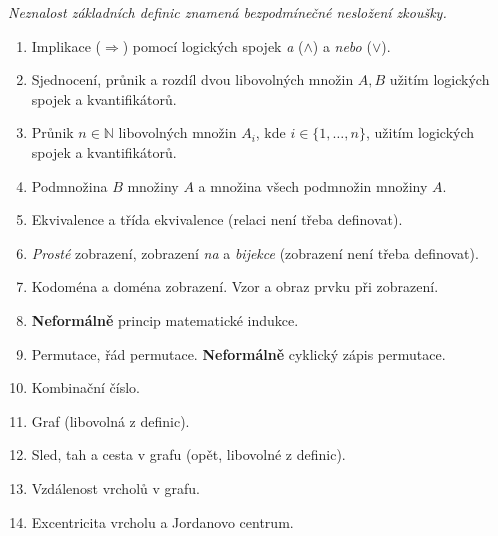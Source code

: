 \documentclass[a4paper,11pt]{article}
\newcommand{\N}{\mathbb{N}}
\begin{document}
 \begin{tcolorbox}[title=\textsf{Základní
   definice (0 bodů)},arc=0mm,boxsep=3mm,bottomrule=1pt,toprule=1pt,leftrule=-0.1mm,
   rightrule=-0.1mm,colframe=CornflowerBlue!80!white,
   colback=CornflowerBlue!5!white]
  \emph{Neznalost základních definic znamená bezpodmínečné nesložení
  zkoušky.}
  \begin{enumerate}
   \item Implikace ($ \Rightarrow $) pomocí logických spojek \emph{a} ($ \wedge
    $) a \emph{nebo} ($ \vee $).
   \item Sjednocení, průnik a rozdíl dvou libovolných množin $A,B$ užitím
    logických spojek a kvantifikátorů.
   \item Průnik $n \in \N$ libovolných množin $A_i$, kde $i \in
    \{1,\ldots,n\}$, užitím logických spojek a kvantifikátorů.
   \item Podmnožina $B$ množiny $A$ a množina všech podmnožin množiny $A$.
   \item Ekvivalence a třída ekvivalence (relaci není třeba definovat).
   \item \emph{Prosté} zobrazení, zobrazení \emph{na} a \emph{bijekce}
    (zobrazení není třeba definovat).
   \item Kodoména a doména zobrazení. Vzor a obraz prvku při zobrazení.
   \item \textbf{Neformálně} princip matematické indukce.
   \item Permutace, řád permutace. \textbf{Neformálně} cyklický zápis permutace.
   \item Kombinační číslo.
   \item Graf (libovolná z definic).
   \item Sled, tah a cesta v grafu (opět, libovolné z definic).
   \item Vzdálenost vrcholů v grafu.
   \item Excentricita vrcholu a Jordanovo centrum.
  \end{enumerate}
 \end{tcolorbox}
 \clearpage
\end{document}
